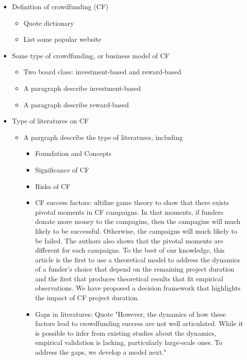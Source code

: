 \begin{itemize}
	\item Definition of crowdfunding (CF)
	      \begin{itemize}
		      \item Quote dictionary \cite{2023}
		      \item List some popular website
	      \end{itemize}
	\item Some type of crowdfunding, or business model of CF
	      \begin{itemize}
		      \item Two board class: investment-based and reward-based \cite{belleflamme2015}
		      \item A paragraph describe investment-based
		      \item A paragraph describe reward-based
	      \end{itemize}
	\item Type of literatures on CF \cite{xie2019}
	      \begin{itemize}
		      \item A pargraph describe the type of literatures, including
		            \begin{itemize}
			            \item Foundation and Concepts
			            \item Significance of CF
			            \item Risks of CF
			            \item CF success factors:
			                  \cite{lindasalahaldin2022} ultilize game theory to show that there exists pivotal moments in CF campaigns.
			                  In that moments, if funders donate more money to the campagins, then the campagins will much likely to be successful.
			                  Otherwise, the campaigns will much likely to be failed.
			                  The authors also shows that the pivotal moments are different for each campaigns.
			                  \cite{salahaldin2019} To the best of our knowledge, this article is the first to use a theoretical model to address the dynamics of a funder’s choice that depend on the remaining project duration and the first that produces theoretical results that fit empirical observations.
			                  We have proposed a decision framework that highlights the impact of CF project duration.
			            \item Gaps in literatures:
			                  Quote "However, the dynamics of how these factors lead to crowdfunding success are not well articulated.
			                  While it is possible to infer from existing studies about the dynamics, empirical validation is lacking, particularly large-scale ones.
			                  To address the gaps, we develop a model next."
		            \end{itemize}
	      \end{itemize}
\end{itemize}

